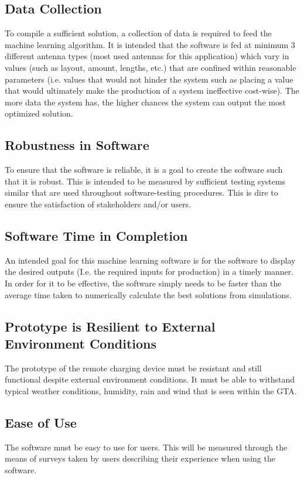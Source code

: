\documentclass[12pt,a4]{report}
\begin{document}
\subsection*{Data Collection}
To compile a sufficient solution, a collection of data is required to feed the machine learning algorithm. It is intended that the software is fed at minimum 3 different antenna types (most used antennas for this application) which vary in values (such as layout, amount, lengths, etc.) that are confined within reasonable parameters (i.e. values that would not hinder the system such as placing a value that would ultimately make the production of a system ineffective cost-wise). The more data the system has, the higher chances the system can output the most optimized solution.

\subsection*{Robustness in Software}
To ensure that the software is reliable, it is a goal to create the software such that it is robust. This is intended to be measured by sufficient testing systems similar that are used throughout software-testing procedures. This is dire to ensure the satisfaction of stakeholders and/or users. 

\subsection*{Software Time in Completion}
An intended goal for this machine learning software is for the software to display the desired outputs (I.e. the required inputs for production) in a timely manner. In order for it to be effective, the software simply needs to be faster than the average time taken to numerically calculate the best solutions from simulations. 

\subsection*{Prototype is Resilient to External Environment Conditions}
The prototype of the remote charging device must be resistant and still functional despite external environment conditions. It must be able to withstand typical weather conditions, humidity, rain and wind that is seen within the GTA. 

\subsection*{Ease of Use}
The software must be easy to use for users. This will be measured through the means of surveys taken by users describing their experience when using the software.
\end{document}
